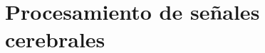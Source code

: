 \documentclass[11pt,spanish,listoffigures,listoftables]{tfgetsinf}
\begin{document}



\section{Procesamiento de señales cerebrales}


\end{document}
